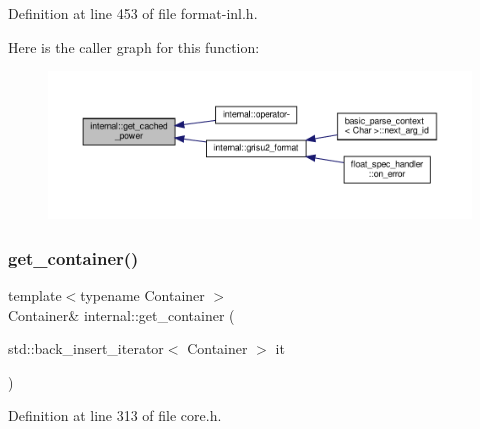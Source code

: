 Definition at line 453 of file format-\/inl.\+h.

Here is the caller graph for this function\+:
\nopagebreak
\begin{figure}[H]
\begin{center}
\leavevmode
\includegraphics[width=350pt]{namespaceinternal_aeafc6f6fcfd4e798c6bde994828330e6_icgraph}
\end{center}
\end{figure}
\mbox{\label{namespaceinternal_a8cf1f0f18fd01743349131744dc7c1c3}} 
\subsubsection{\texorpdfstring{get\+\_\+container()}{get\_container()}}
{\footnotesize\ttfamily template$<$typename Container $>$ \\
Container\& internal\+::get\+\_\+container (\begin{DoxyParamCaption}\item[{std\+::back\+\_\+insert\+\_\+iterator$<$ Container $>$}]{it }\end{DoxyParamCaption})\hspace{0.3cm}{\ttfamily [inline]}}



Definition at line 313 of file core.\+h.

